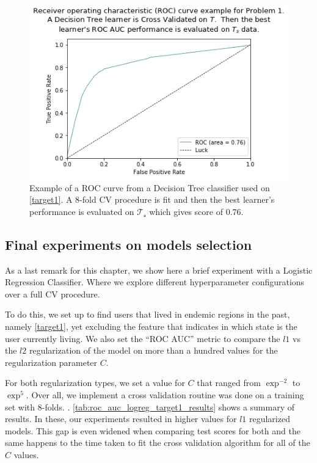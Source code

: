 \begin{figure}[h!]
\begin{center}
\includegraphics[width=0.7\columnwidth]{figures/figure-highROCAUC/figure-highROCAUC}
\caption{Example of a ROC curve from a Decision Tree classifier used on \cref{target1}. A 8-fold CV procedure is fit and then the best learner's performance is evaluated on $\mathcal{T_s}$ which gives score of $0.76$.}
\label{fg:highROCAUC}
\end{center}
\end{figure}


\subsection{Final experiments on models selection}\label{sub:final_model_selection}

As a last remark for this chapter, we show here a brief experiment with a Logistic Regression Classifier. Where we explore different hyperparameter configurations over a full CV procedure.

To do this, we set up to find users that lived in endemic regions in the past, namely \cref{target1}, yet excluding the feature that indicates in which state is the user currently living.
We also set the ``ROC AUC'' metric to compare the $l1$ vs the $l2$ regularization of the model on more than a hundred values for the regularization parameter $C$.

For both regularization types, we set a value for $C$ that ranged from $\exp^{-2}$ to $\exp^{5}$. Over all, we implement a cross validation routine was done on a training set with 8-folds.
.
\cref{tab:roc_auc_logreg_target1_results} shows a summary of results.
In these, our experiments resulted in higher values for $l1$ regularized models.
This gap is even widened when comparing test scores for both and the same happens to the time taken to fit the cross validation algorithm for all of the $C$ values.


